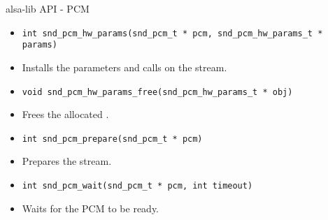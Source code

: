 \begin{frame}[fragile]{alsa-lib API - PCM}
  \begin{itemize}
  \item
    \begin{block}{}
    \fontsize{9}{9}\selectfont
      \begin{verbatim}
int snd_pcm_hw_params(snd_pcm_t * pcm, snd_pcm_hw_params_t * params)
       \end{verbatim}
    \end{block}
  \item Installs the parameters and calls  on
    the stream.
  \item
    \begin{block}{}
    \fontsize{9}{9}\selectfont
      \begin{verbatim}
void snd_pcm_hw_params_free(snd_pcm_hw_params_t * obj)
      \end{verbatim}
    \end{block}
  \item Frees the allocated .
  \item
    \begin{block}{}
    \fontsize{9}{9}\selectfont
      \begin{verbatim}
int snd_pcm_prepare(snd_pcm_t * pcm)
      \end{verbatim}
    \end{block}
  \item Prepares the stream.
  \item
    \begin{block}{}
    \fontsize{9}{9}\selectfont
      \begin{verbatim}
int snd_pcm_wait(snd_pcm_t * pcm, int timeout)
      \end{verbatim}
    \end{block}
  \item Waits for the PCM to be ready.
  \end{itemize}
\end{frame}

